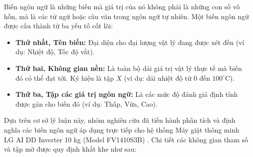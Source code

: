 \documentclass[12pt, a4paper]{article}
\begin{document}
Biến ngôn ngữ là những biến mà giá trị của nó không phải là những con số vô hồn, mà là các từ ngữ hoặc câu văn trong ngôn ngữ tự nhiên. Một biến ngôn ngữ được cấu thành từ ba yếu tố cốt lõi:
\begin{itemize}
    \item \textbf{Thứ nhất, Tên biến:} Đại diện cho đại lượng vật lý đang được xét đến (ví dụ: Nhiệt độ, Tốc độ vắt).
    \item \textbf{Thứ hai, Không gian nền:} Là toàn bộ dải giá trị vật lý thực tế mà biến đó có thể đạt tới. Ký hiệu là tập $X$ (ví dụ: dải nhiệt độ từ 0 đến $100^\circ$C).
    \item \textbf{Thứ ba, Tập các giá trị ngôn ngữ:} Là các mức độ đánh giá định tính được gán cho biến đó (ví dụ: Thấp, Vừa, Cao).
\end{itemize}

Dựa trên cơ sở lý luận này, nhóm nghiên cứu đã tiến hành phân tích và định nghĩa các biến ngôn ngữ áp dụng trực tiếp cho hệ thống Máy giặt thông minh LG AI DD Inverter 10 kg (Model FV1410S3B) \cite{lg_specs}. Chi tiết các không gian tham số và tập mờ được quy định khắt khe như sau:
\end{document}
